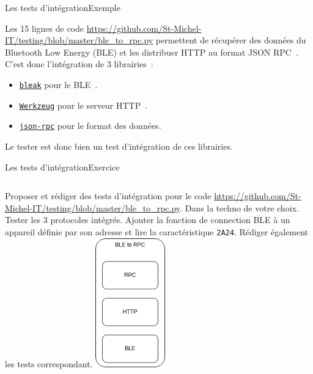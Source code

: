 \documentclass{beamer}
\begin{document}
    \begin{frame}{Les tests d'intégration}{Exemple}

        Les 15 lignes de code \url{https://github.com/St-Michel-IT/testing/blob/master/ble_to_rpc.py} permettent de récupérer des données du Bluetooth Low Energy (BLE) et les distribuer  HTTP au format JSON RPC~.
        \bigbreak
        C'est donc l'intégration de 3 librairies~:
        \begin{itemize}
            \item \href{https://bleak.readthedocs.io/en/latest/index.html}{\lstinline{bleak}} pour le BLE~.
            \item \href{https://werkzeug.palletsprojects.com/en/3.0.x/}{\lstinline{Werkzeug}} pour le serveur HTTP~.
            \item \href{https://github.com/pavlov99/json-rpc}{\lstinline{json-rpc}} pour le format des données.
        \end{itemize}
        \bigbreak
        Le tester est donc bien un test d'intégration de ces librairies.
    \end{frame}

    \begin{frame}{Les tests d'intégration}{Exercice \execcounterdispinc{}}
        \begin{columns}
            Proposer et rédiger des tests d'intégration pour le code \url{https://github.com/St-Michel-IT/testing/blob/master/ble_to_rpc.py}.
            Dans la techno de votre choix.
            \bigbreak
            Tester les 3 protocoles intégrés.
            \bigbreak
            Ajouter la fonction de connection BLE à un appareil définie par son adresse et lire la caractéristique  \lstinline{2A24}.
            Rédiger également les tests correspondant.
            \centering
            \includegraphics[width=3cm]{image/ble-2-rpc-stack.drawio}
        \end{columns}
    \end{frame}
\end{document}
